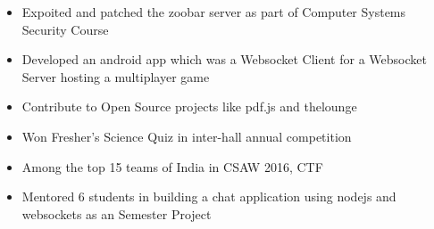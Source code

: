 
\begin{itemize}
  \item Expoited and patched the zoobar server as part of Computer Systems
    Security Course
  \item Developed an android app which was a Websocket Client for a
    Websocket Server hosting a multiplayer game
  \item Contribute to Open Source projects like pdf.js and thelounge
  \item Won Fresher's Science Quiz in inter-hall annual competition
  \item Among the top 15 teams of India in CSAW 2016, CTF
  \item Mentored 6 students in building a chat application
    \ifdefined \ONEPAGE \else
    using nodejs and
    websockets as an Semester Project
    \fi
    \vspace{-1mm}
\end{itemize}
